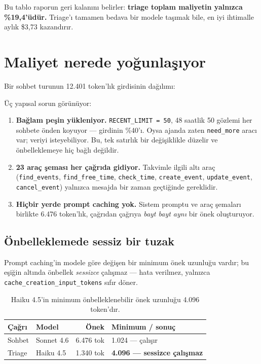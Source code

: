 \documentclass[11pt,a4paper]{article}
\newcommand{\code}[1]{\texttt{\small #1}}
\begin{document}
Bu tablo raporun geri kalanını belirler: \textbf{triage toplam maliyetin yalnızca
\%19{,}4'üdür.} Triage'ı tamamen bedava bir modele taşımak bile, en iyi ihtimalle aylık
\$3{,}73 kazandırır.

\section{Maliyet nerede yoğunlaşıyor}

Bir sohbet turunun 12.401 token'lık girdisinin dağılımı:

\begin{table}[h]
\centering\small

\caption{Sohbet girdisinin bileşenleri (\code{workers/chat.py}).}
\end{table}

Üç yapısal sorun görünüyor:

\begin{enumerate}[leftmargin=1.4em,itemsep=4pt]
  \item \textbf{Bağlam peşin yükleniyor.} \code{RECENT\_LIMIT = 50}, 48 saatlik 50 gözlemi
        her sohbete önden koyuyor --- girdinin \%40'ı. Oysa ajanda zaten \code{need\_more}
        aracı var; veriyi isteyebiliyor. Bu, tek satırlık bir değişiklikle düzelir ve
        önbelleklemeye hiç bağlı değildir.
  \item \textbf{23 araç şeması her çağrıda gidiyor.} Takvimle ilgili altı araç
        (\code{find\_events}, \code{find\_free\_time}, \code{check\_time},
        \code{create\_event}, \code{update\_event}, \code{cancel\_event}) yalnızca
        mesajda bir zaman geçtiğinde gereklidir.
  \item \textbf{Hiçbir yerde prompt caching yok.} Sistem promptu ve araç şemaları birlikte
        6.476 token'lık, çağrıdan çağrıya \emph{bayt bayt aynı} bir önek oluşturuyor.
\end{enumerate}

\subsection{Önbelleklemede sessiz bir tuzak}

Prompt caching'in modele göre değişen bir minimum önek uzunluğu vardır; bu eşiğin altında
önbellek \emph{sessizce} çalışmaz --- hata verilmez, yalnızca
\code{cache\_creation\_input\_tokens} sıfır döner.

\begin{table}[h]
\centering\small
\begin{tabular}{@{}llrl@{}}
\toprule
\textbf{Çağrı} & \textbf{Model} & \textbf{Önek} & \textbf{Minimum / sonuç} \\
\midrule
Sohbet & Sonnet 4.6 & 6.476 tok & 1.024 --- çalışır \\
Triage & Haiku 4.5 & 1.340 tok & \textbf{4.096 --- sessizce çalışmaz} \\
\bottomrule
\end{tabular}
\caption{Haiku 4.5'in minimum önbelleklenebilir önek uzunluğu 4.096 token'dır.}
\end{table}
\end{document}
